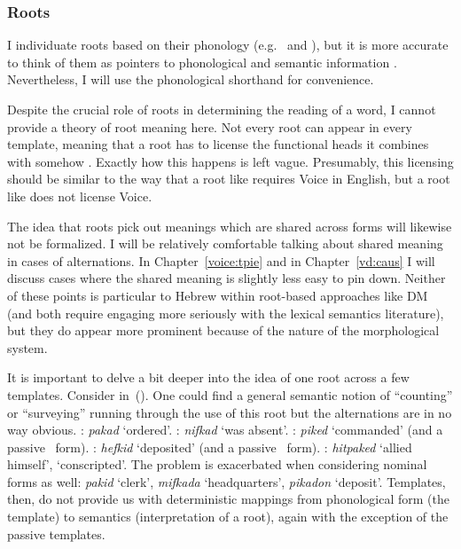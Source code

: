 		\subsubsection{Roots}
I individuate roots based on their phonology (e.g.~ and ), but it is more accurate to think of them as pointers to phonological and semantic information \citep{harley14thlia,faust16,kastner18nllt}. Nevertheless, I will use the phonological shorthand for convenience.

Despite the crucial role of roots in determining the reading of a word, I cannot provide a theory of root meaning here. Not every root can appear in every template, meaning that a root has to license the functional heads it combines with somehow \citep{harleynoyer00}. Exactly how this happens is left vague. Presumably, this licensing should be similar to the way that a root like  requires Voice in English, but a root like  does not license Voice.

The idea that roots pick out meanings which are shared across forms will likewise not be formalized. I will be relatively comfortable talking about shared meaning in cases of alternations. In Chapter~\ref{voice:tpie} and in Chapter~\ref{vd:caus} I will discuss cases where the shared meaning is slightly less easy to pin down. Neither of these points is particular to Hebrew within root-based approaches like DM (and both require engaging more seriously with the lexical semantics literature), but they do appear more prominent because of the nature of the morphological system.

It is important to delve a bit deeper into the idea of one root across a few templates. Consider  in~(\nextx).  One could find a general semantic notion of ``counting'' or ``surveying'' running through the use of this root but the alternations are in no way obvious. 
\pex\label{ex:naive-pkd}
  \a \tkal: \emph{pakad} `ordered'.
  \a \tnif: \emph{nifkad} `was absent'.
  \a \tpie: \emph{piked} `commanded' (and a passive \tpua~form).
  \a \thif: \emph{hefkid} `deposited' (and a passive \thuf~form).
  \a \thit: \emph{hitpaked} `allied himself', `conscripted'.
\xe
The problem is exacerbated when considering nominal forms as well: \emph{pakid} `clerk', \emph{mifkada} `headquarters', \emph{pikadon} `deposit'. Templates, then, do not provide us with deterministic mappings from phonological form (the template) to semantics (interpretation of a root), again with the exception of the passive templates.

